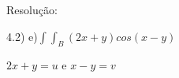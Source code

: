 \documentclass{article}
\begin{document}
Resolução:

4.2) e)$\int\int_B (2x+y)cos(x-y)$
	
	$2x+y = u$ e $x-y = v$
	
\end{document}
